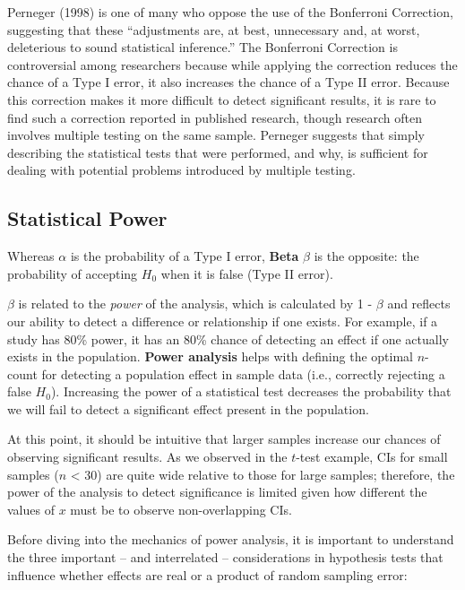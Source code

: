 \documentclass[
]{book}
\begin{document}
Perneger (1998) is one of many who oppose the use of the Bonferroni Correction, suggesting that these ``adjustments are, at best, unnecessary and, at worst, deleterious to sound statistical inference.'' The Bonferroni Correction is controversial among researchers because while applying the correction reduces the chance of a Type I error, it also increases the chance of a Type II error. Because this correction makes it more difficult to detect significant results, it is rare to find such a correction reported in published research, though research often involves multiple testing on the same sample. Perneger suggests that simply describing the statistical tests that were performed, and why, is sufficient for dealing with potential problems introduced by multiple testing.

\hypertarget{statistical-power}{%
\subsection{Statistical Power}\label{statistical-power}}

Whereas \(\alpha\) is the probability of a Type I error, \textbf{Beta} \(\beta\) is the opposite: the probability of accepting \(H_0\) when it is false (Type II error).

\(\beta\) is related to the \emph{power} of the analysis, which is calculated by 1 - \(\beta\) and reflects our ability to detect a difference or relationship if one exists. For example, if a study has 80\% power, it has an 80\% chance of detecting an effect if one actually exists in the population. \textbf{Power analysis} helps with defining the optimal \(n\)-count for detecting a population effect in sample data (i.e., correctly rejecting a false \(H_0\)). Increasing the power of a statistical test decreases the probability that we will fail to detect a significant effect present in the population.

At this point, it should be intuitive that larger samples increase our chances of observing significant results. As we observed in the \(t\)-test example, CIs for small samples (\(n\) \textless{} 30) are quite wide relative to those for large samples; therefore, the power of the analysis to detect significance is limited given how different the values of \(x\) must be to observe non-overlapping CIs.

Before diving into the mechanics of power analysis, it is important to understand the three important -- and interrelated -- considerations in hypothesis tests that influence whether effects are real or a product of random sampling error:
\end{document}
